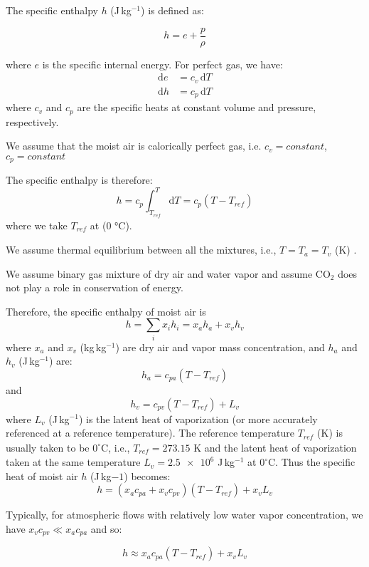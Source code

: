 The specific enthalpy $h$ (J\,kg$^{-1}$) is defined as:

\begin{equation}
h = e + \frac{p}{\rho}
\end{equation}

where $e$ is the specific internal energy. For perfect gas, we have:
\begin{align}
\mathrm{d}e &= c_v \,\mathrm{d}T\\
\mathrm{d}h &= c_p \,\mathrm{d}T
\end{align}
where $c_v$ and $c_p$ are the specific heats at constant volume and pressure, respectively.
\begin{assumption}
	We assume that the moist air is calorically perfect gas, i.e. $c_v=\textit{constant}$, $c_p=\textit{constant}$
\end{assumption}
The specific enthalpy is therefore:
\begin{equation}
h = c_p \int^T_{T_{\textit{ref}}} \mathrm{d}T = c_p \left(T - T_{\textit{ref}}\right)
\end{equation}
where we take $T_{\textit{ref}}$ at ($0$ \si{\degreeCelsius}).
\begin{assumption}
	We assume thermal equilibrium between all the mixtures, i.e., $T = T_a = T_v$ (K) \citep{Defraeye2011}.
\end{assumption}


\begin{assumption}
	We assume binary gas mixture of dry air and water vapor and assume CO$_2$ does not play a role in conservation of energy.
\end{assumption}

Therefore, the specific enthalpy of moist air is 
\begin{equation}
h = \sum_i x_i h_i = x_a h_a + x_v h_v
\end{equation}
where $x_a$ and $x_v$ (kg\,kg$^{-1}$) are dry air and vapor mass concentration, and $h_a$ and $h_v$ (J\,kg$^{-1}$) are:
\begin{equation}
h_a = c_{pa} \left(T - T_{\textit{ref}}\right)
\end{equation}
and 
\begin{equation}
h_v = c_{pv} \left(  T - T_{\textit{ref}}\right) + L_v
\end{equation}
where $L_v$ (J\,kg$^{-1}$) is the latent heat of vaporization (or more accurately referenced at a reference temperature). The reference temperature $T_{\textit{ref}}$ (K) is usually taken to be $0^{\circ}$C, i.e., $T_{\textit{ref}} = 273.15$ K and the latent heat of vaporization taken at the same temperature $L_v = \num{2.5e6}$ J\,kg$^{-1}$ at $0^{\circ}$C. Thus the specific heat of moist air $h$ (J\,kg${-1}$) becomes:
\begin{equation}
h = \left(x_a c_{pa} + x_v c_{pv} \right) \left(T - T_{\textit{ref}}\right)  + x_v L_v
\label{eq:enthalpymoistair}
\end{equation}

Typically, for atmospheric flows with relatively low water vapor concentration, we have $x_v c_{pv} \ll x_a c_{pa}$ and so: 

\begin{equation}
h \approx x_a c_{pa} \left(T - T_{\textit{ref}}\right)  + x_v L_v
\end{equation}

